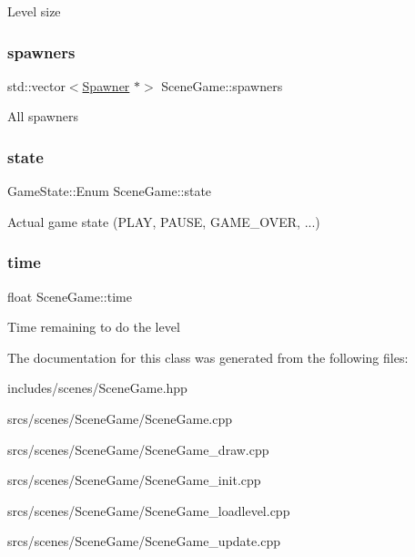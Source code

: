 Level size \mbox{\label{class_scene_game_a97955bb4971b1800da1e15bcb472150d}} 
\subsubsection{\texorpdfstring{spawners}{spawners}}
{\footnotesize\ttfamily std\+::vector$<$\hyperlink{class_spawner}{Spawner} $\ast$$>$ Scene\+Game\+::spawners}

All spawners \mbox{\label{class_scene_game_a148576dff8050dfcf438ff29c0aaf400}} 
\subsubsection{\texorpdfstring{state}{state}}
{\footnotesize\ttfamily Game\+State\+::\+Enum Scene\+Game\+::state}

Actual game state (P\+L\+AY, P\+A\+U\+SE, G\+A\+M\+E\+\_\+\+O\+V\+ER, ...) \mbox{\label{class_scene_game_a7035bc7e8801e4d17cab3128d6d60be0}} 
\subsubsection{\texorpdfstring{time}{time}}
{\footnotesize\ttfamily float Scene\+Game\+::time}

Time remaining to do the level 

The documentation for this class was generated from the following files\+:\begin{DoxyCompactItemize}
\item 
includes/scenes/Scene\+Game.\+hpp\item 
srcs/scenes/\+Scene\+Game/Scene\+Game.\+cpp\item 
srcs/scenes/\+Scene\+Game/Scene\+Game\+\_\+draw.\+cpp\item 
srcs/scenes/\+Scene\+Game/Scene\+Game\+\_\+init.\+cpp\item 
srcs/scenes/\+Scene\+Game/Scene\+Game\+\_\+loadlevel.\+cpp\item 
srcs/scenes/\+Scene\+Game/Scene\+Game\+\_\+update.\+cpp\end{DoxyCompactItemize}
